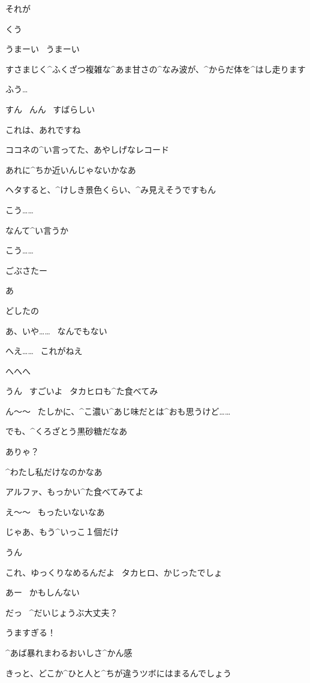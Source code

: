 \Alpha それが

\page
\Alpha くう

\Alpha うまーい
\ うまーい

\Alpha すさまじく^{ふくざつ}{複雑}な^{あま}{甘}さの^{なみ}{波}が、^{からだ}{体}を^{はし}{走}ります

\page
\Alpha ふう…

\Alpha すん
\ んん
\ すばらしい

\Alpha これは、あれですね

\Alpha ココネの^{い}{言}ってた、あやしげなレコード

\Alpha あれに^{ちか}{近}いんじゃないかなあ

\Alpha ヘタすると、^{けしき}{景色}くらい、^{み}{見}えそうですもん

\Alpha こう……

\Alpha なんて^{い}{言}うか

\Alpha こう……

\page
\Takahiro ごぶさたー

\Alpha あ

\Takahiro どしたの

\Alpha あ、いや……
\ なんでもない

\page
\Takahiro へえ……
\ これがねえ

\Alpha へへへ

\Alpha うん
\ すごいよ
\ タカヒロも^{た}{食}べてみ

\Takahiro ん〜〜
\ たしかに、^{こ}{濃}い^{あじ}{味}だとは^{おも}{思}うけど……

\Takahiro でも、^{くろざとう}{黒砂糖}だなあ

\Alpha ありゃ？

\page
\Alpha ^{わたし}{私}だけなのかなあ

\Takahiro アルファ、もっかい^{た}{食}べてみてよ

\Alpha え〜〜
\ もったいないなあ

\Alpha じゃあ、もう^{いっこ}{１個}だけ

\Takahiro うん

\Alpha これ、ゆっくりなめるんだよ
\ タカヒロ、かじったでしょ

\Takahiro あー
\ かもしんない

\page[82]
\Takahiro だっ
\ ^{だいじょうぶ}{大丈夫}？

\Alpha うますぎる！

\page
\Alpha ^{あば}{暴}れまわるおいしさ^{かん}{感}

\Alpha きっと、どこか^{ひと}{人}と^{ちが}{違}うツボにはまるんでしょう

